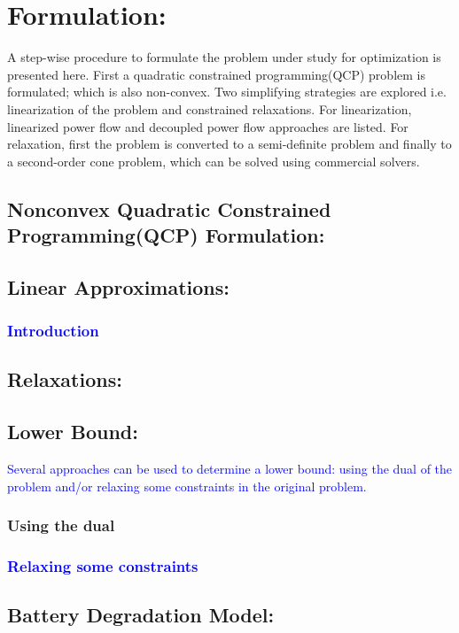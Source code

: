\newpage
\section{Formulation:}

 A step-wise procedure to formulate the problem under study for optimization is presented here. First a quadratic constrained programming(QCP) problem is formulated; which is also non-convex. Two simplifying strategies are explored i.e. linearization of the problem and constrained relaxations. For linearization, linearized power flow and decoupled power flow approaches are listed. For relaxation, first the problem is converted to a semi-definite problem and finally to a second-order cone problem, which can be solved using commercial solvers. 
 
 \subsection{Nonconvex Quadratic Constrained Programming(QCP) Formulation:}
 
 
 \subsection{Linear Approximations:}
 
 \subsubsection{\textcolor{blue}{Introduction}}
 
 
 
 \subsection{Relaxations:}
 
 
 \subsection{Lower Bound:}
 
 \textcolor{blue}{Several approaches can be used to determine a lower bound: using the dual of the problem and/or relaxing some constraints in the original problem.}
 
 \subsubsection{Using the dual}
 
 
 \subsubsection{\textcolor{blue}{Relaxing some constraints}}
 
  
 
 \subsection{Battery Degradation Model:}
 
 

